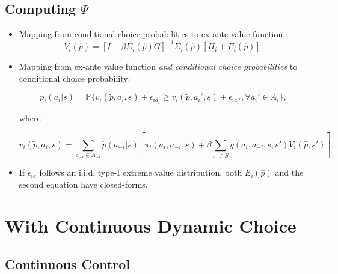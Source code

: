 \documentclass[]{book}
\begin{document}
\subsection{\texorpdfstring{Computing
\(\Psi\)}{Computing \textbackslash{}Psi}}\label{computing-psi}

\begin{itemize}
\item
  Mapping from conditional choice probabilities to ex-ante value
  function: \[
  V_i(\hat{p}) = [I - \beta \Sigma_i(\hat{p})G]^{-1}\Sigma_i(\hat{p})[\Pi_i + E_i(\hat{p})].
  \]
\item
  Mapping from ex-ante value function
  \textit{and conditional choice probabilities} to conditional choice
  probability:

  \begin{equation}
  p_i(a_i|s) =  \mathbb{P}\{v_i(\tilde{p}, a_i, s) + \epsilon_{ia_i} \ge  v_i(\tilde{p}, a_i', s) + \epsilon_{ia_i'}, \forall a_i' \in A_i\},
  \end{equation}

  where

  \begin{equation}
  v_i(\tilde{p}, a_i, s) = \sum_{a_{-i} \in A_{-i}} \tilde{p}(a_{-i}|s) [\pi_i(a_i, a_{-i}, s) + \beta \sum_{s' \in S} g(a_i, a_{-i}, s, s') V_i(\hat{p}, s')].
  \end{equation}
\item
  If \(\epsilon_{ia}\) follows an i.i.d. type-I extreme value
  distribution, both \(E_i(\hat{p})\) and the second equation have
  closed-forms.
\end{itemize}

\section{With Continuous Dynamic
Choice}\label{with-continuous-dynamic-choice}

\subsection{Continuous Control}\label{continuous-control}
\end{document}
